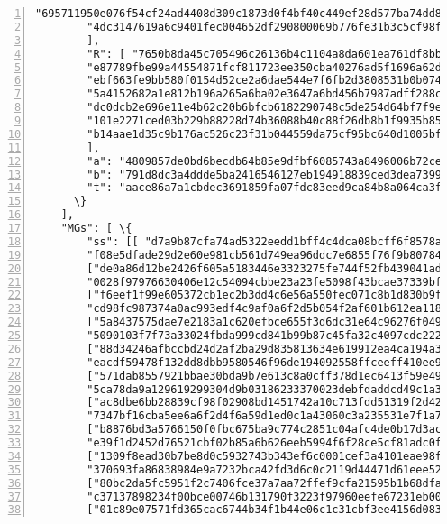 \begin{appendices}
\begin{Verbatim}[commandchars=\\\{\}, numbers=left]
        "695711950e076f54cf24ad4408d309c1873d0f4bf40c449ef28d577ba74dd86d",
        "4dc3147619a6c9401fec004652df290800069b776fe31b3c5cf98f64eb13ef2c"
        ], 
        "R": [ "7650b8da45c705496c26136b4c1104a8da601ea761df8bba07f1249495d8f1ce",
        "e87789fbe99a44554871fcf811723ee350cba40276ad5f1696a62d91a4363fa6",
        "ebf663fe9bb580f0154d52ce2a6dae544e7f6fb2d3808531b0b0749f5152ddbf",
        "5a4152682a1e812b196a265a6ba02e3647a6bd456b7987adff288c5b0b556ec6",
        "dc0dcb2e696e11e4b62c20b6bfcb6182290748c5de254d64bf7f9e3c38fb46c9",
        "101e2271ced03b229b88228d74b36088b40c88f26db8b1f9935b85fb3ab96043",
        "b14aae1d35c9b176ac526c23f31b044559da75cf95bc640d1005bfcc6367040b"
        ], 
        "a": "4809857de0bd6becdb64b85e9dfbf6085743a8496006b72ceb81e01080965003", 
        "b": "791d8dc3a4ddde5ba2416546127eb194918839ced3dea7399f9c36a17f36150e", 
        "t": "aace86a7a1cbdec3691859fa07fdc83eed9ca84b8a064ca3f0149e7d6b721c03"
      \}
    ], 
    "MGs": [ \{
        "ss": [[ "d7a9b87cfa74ad5322eedd1bff4c4dca08bcff6f8578a29a8bc4ad6789dee106",
        "f08e5dfade29d2e60e981cb561d749ea96ddc7e6855f76f9b807842d1a17fe00"],
        ["de0a86d12be2426f605a5183446e3323275fe744f52fb439041ad2d59136ea0b",
        "0028f97976630406e12c54094cbbe23a23fe5098f43bcae37339bfc0c4c74c07"],
        ["f6eef1f99e605372cb1ec2b3dd4c6e56a550fec071c8b1d830b9fda34de5cc05",
        "cd98fc987374a0ac993edf4c9af0a6f2d5b054f2af601b612ea118f405303306"],
        ["5a8437575dae7e2183a1c620efbce655f3d6dc31e64c96276f04976243461e08",
        "5090103f7f73a33024fbda999cd841b99b87c45fa32c4097cdc222fa3d7e9502"],
        ["88d34246afbccbd24d2af2ba29d835813634e619912ea4ca194a32281ac14e0e",
        "eacdf59478f132dd8dbb9580546f96de194092558ffceeff410ee9eb30ce570e"],
        ["571dab8557921bbae30bda9b7e613c8a0cff378d1ec6413f59e4972f30f2470d",
        "5ca78da9a129619299304d9b03186233370023debfdaddcd49c1a338c1f0c50d"],
        ["ac8dbe6bb28839cf98f02908bd1451742a10c713fdd51319f2d42a58bf1d7507",
        "7347bf16cba5ee6a6f2d4f6a59d1ed0c1a43060c3a235531e7f1a75cd8c8530d"],
        ["b8876bd3a5766150f0fbc675ba9c774c2851c04afc4de0b17d3ac4b6de617402",
        "e39f1d2452d76521cbf02b85a6b626eeb5994f6f28ce5cf81adc0ff2b8adb907"],
        ["1309f8ead30b7be8d0c5932743b343ef6c0001cef3a4101eae98ffde53f46300",
        "370693fa86838984e9a7232bca42fd3d6c0c2119d44471d61eee5233ba53c20f"],
        ["80bc2da5fc5951f2c7406fce37a7aa72ffef9cfa21595b1b68dfab4b7b9f9f0c",
        "c37137898234f00bce00746b131790f3223f97960eefe67231eb001092f5510c"],
        ["01c89e07571fd365cac6744b34f1b44e06c1c31cbf3ee4156d08309345fdb20e",

\end{Verbatim}
\end{appendices}
